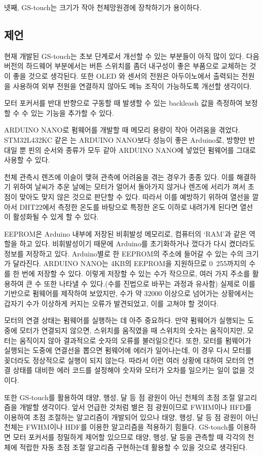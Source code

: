 넷째, GS-touch는 크기가 작아 천체망원경에 장착하기가 용이하다. 

\subsection{제언}

현재 개발된 GS-touch는 초보 단계로서 개선할 수 있는 부분들이 아직 많이 있다. 다음 버전의 하드웨어 부분에서는 버튼 스위치를 좀더 내구성이 좋은 부품으로 교체하는 것이 좋을 것으로 생각된다. 또한 OLED 와 센서의 전원은 아두이노에서 출력되는 전원을 사용하여 외부 전원을 연결하지 않아도 메뉴 조작이 가능하도록 개선할 생각이다.

\begin{description}[font=$\bullet$~\normalfont\scshape\color{red!50!black}]
	\item [Backleash 보정 기능 추가] 모터 포커서를 반대 반향으로 구동할 때 발생할 수 있는 backleash 값을 측정하여 보정할 수 수 있는 기능을 추가할 수 있다.
	\item [MCU 변경] ARDUINO NANO로 펌웨어를 개발할 때 메모리 용량이 작아 어려움을 겪었다. STM32L432KC 같은 는 ARDUINO NANO보다 성능이 좋은 Arduino로, 방향만 반대일 뿐 핀의 순서와 종류가 모두 같아 ARDUINO NANO에 넣었던 펌웨어를 그대로 사용할 수 있다.
	\item [Heating system 추가] 천체 관측시 렌즈에 이슬이 맺혀 관측에 어려움을 겪는 경우가 종종 있다. 이를 해결하기 위하여 날씨가 추운 날에는 모터가 얼어서 돌아가지 않거나 렌즈에 서리가 껴서 초점이 맞아도 맞지 않은 것으로 판단할 수 있다. 따라서 이를 예방하기 위하여 열선을 깔아서 DHT22에서 측정한 온도를 바탕으로 특정한 온도 이하로 내려가게 된다면 열선이 활성화될 수 있게 할 수 있다.
	\item [EEPROM 활용] EEPROM은 Arduino 내부에 저장된 비휘발성 메모리로, 컴퓨터의 ‘RAM’과 같은 역할을 하고 있다. 비휘발성이기 때문에 Arduino를 초기화하거나 껐다가 다시 켰더라도 정보를 저장하고 있다. 
	Arduino별로 한 EEPROM의 주소에 들어갈 수 있는 수의 크기가 달라진다. ARDUINO NANO는 4KB의 EEPROM을 지원하므로 0~255까지의 수를 한 번에 저장할 수 있다. 이렇게 저장할 수 있는 수가 작으므로, 여러 가지 주소를 활용하여 큰 수 또한 나타낼 수 있다.(수를 진법으로 바꾸는 과정과 유사함) 실제로 이를 기반으로 펌웨어를 제작하여 보았지만, 수가 약 32000 이상으로 넘어가는 상황에서는 갑자기 수가 이상하게 커지는 오류가 발견되었고, 이를 고쳐야 할 것이다.
	\item [모터 연결 상태 체크 기능 추가] 모터의 연결 상태는 펌웨어를 실행하는 데 아주 중요하다. 만약 펌웨어가 실행되는 도중에 모터가 연결되지 않으면, 스위치를 움직였을 때 스위치의 숫자는 움직이지만, 모터는 움직이지 않아 결과적으로 숫자의 오류를 불러일으킨다. 또한, 모터를 펌웨어가 실행되는 도중에 연결선을 뽑으면 펌웨어에 에러가 일어나는데, 이 경우 다시 모터를 꽂더라도 정상적으로 실행이 되지 않는다. 따라서 이런 여러 상황에 대하여 모터의 연결 상태를 대비한 에러 코드를 설정해야 숫자와 모터가 오차를 일으키는 일이 없을 것이다.
\end{description}

또한 GS-touch를 활용하여 태양, 행성, 달 등 점 광원이 아닌 천체의 초점 조절 알고리즘을 개발할 생각이다. 앞서 언급한 것처럼 별은 점 광원이므로 FWHM이나 HFD를 이용하여 초점 조절하는 알고리즘이 개발되어 있으나 태양, 행성, 달 등 점 광원이 아닌 천체는 FWHM이나 HDF를 이용한 알고리즘을 적용하기 힘들다. GS-touch를 이용하면 모터 포커서를 정밀하게 제어할 있으므로 태양, 행성, 달 등을 관측할 때 각각의 천체에 적랍한 자동 초점 조절 알고리즘 구현하는데 활용할 수 있을 것으로 생각된다. 
